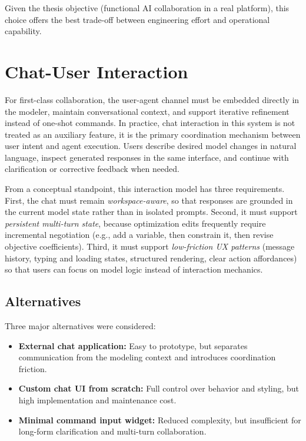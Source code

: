 Given the thesis objective (functional AI collaboration in a real platform), this choice offers the best trade-off between engineering effort and operational capability.

\section{Chat-User Interaction}
For first-class collaboration, the user-agent channel must be embedded directly in the modeler, maintain conversational context, and support iterative refinement instead of one-shot commands. In practice, chat interaction in this system is not treated as an auxiliary feature, it is the primary coordination mechanism between user intent and agent execution. Users describe desired model changes in natural language, inspect generated responses in the same interface, and continue with clarification or corrective feedback when needed.

From a conceptual standpoint, this interaction model has three requirements. First, the chat must remain \emph{workspace-aware}, so that responses are grounded in the current model state rather than in isolated prompts. Second, it must support \emph{persistent multi-turn state}, because optimization edits frequently require incremental negotiation (e.g., add a variable, then constrain it, then revise objective coefficients). Third, it must support \emph{low-friction UX patterns} (message history, typing and loading states, structured rendering, clear action affordances) so that users can focus on model logic instead of interaction mechanics.

\subsection{Alternatives}
Three major alternatives were considered:
\begin{itemize}
    \item \textbf{External chat application:} Easy to prototype, but separates communication from the modeling context and introduces coordination friction.
    \item \textbf{Custom chat UI from scratch:} Full control over behavior and styling, but high implementation and maintenance cost.
    \item \textbf{Minimal command input widget:} Reduced complexity, but insufficient for long-form clarification and multi-turn collaboration.
\end{itemize}

